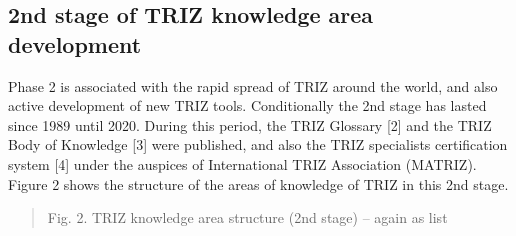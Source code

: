 \documentclass[11pt,a4paper]{article}
\begin{document}
\subsection{2nd stage of TRIZ knowledge area development}

Phase 2 is associated with the rapid spread of TRIZ around the world, and also
active development of new TRIZ tools. Conditionally the 2nd stage has lasted
since 1989 until 2020. During this period, the TRIZ Glossary [2] and the TRIZ
Body of Knowledge [3] were published, and also the TRIZ specialists
certification system [4] under the auspices of International TRIZ Association
(MATRIZ). Figure 2 shows the structure of the areas of knowledge of TRIZ in
this 2nd stage.

\begin{quote}
  Fig. 2. TRIZ knowledge area structure (2nd stage) -- again as list


\end{quote}
\end{document}
